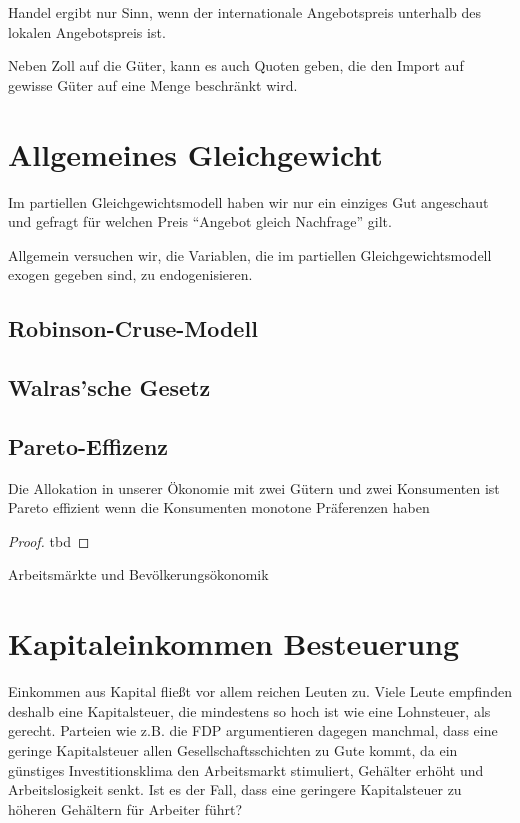 Handel ergibt nur Sinn, wenn der internationale Angebotspreis unterhalb des lokalen Angebotspreis ist.


Neben Zoll auf die Güter, kann es auch Quoten geben, die den Import auf gewisse Güter auf eine Menge beschränkt wird.



\section{Allgemeines Gleichgewicht}
Im partiellen Gleichgewichtsmodell haben wir nur ein einziges Gut
angeschaut und gefragt für welchen Preis \enquote{Angebot gleich Nachfrage} gilt.

Allgemein versuchen wir, die Variablen, die im partiellen Gleichgewichtsmodell exogen gegeben sind,
zu endogenisieren.


\subsection{Robinson-Cruse-Modell}


\subsection{Walras'sche Gesetz}




\subsection{Pareto-Effizenz}


\begin{theorem}[1. Wohlfahrtstheorem]
	Die Allokation in unserer Ökonomie mit zwei
	Gütern und zwei Konsumenten ist Pareto effizient wenn die Konsumenten
	monotone Präferenzen haben
\end{theorem}

\begin{proof}
	tbd
\end{proof}

\begin{remark}
	Arbeitsmärkte und Bevölkerungsökonomik
\end{remark}


\section{Kapitaleinkommen Besteuerung}
Einkommen aus Kapital fließt vor allem reichen Leuten zu. Viele Leute
empfinden deshalb eine Kapitalsteuer, die mindestens so hoch ist wie eine
Lohnsteuer, als gerecht. Parteien wie z.B. die FDP argumentieren dagegen
manchmal, dass eine geringe Kapitalsteuer allen Gesellschaftsschichten zu
Gute kommt, da ein günstiges Investitionsklima den Arbeitsmarkt
stimuliert, Gehälter erhöht und Arbeitslosigkeit senkt.
Ist es der Fall, dass eine geringere Kapitalsteuer zu höheren Gehältern für
Arbeiter führt?

